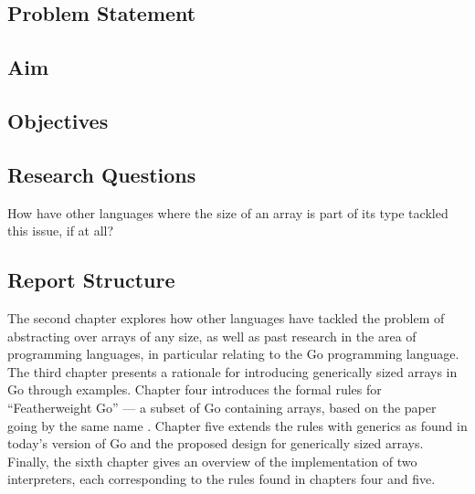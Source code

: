 

\subsection{Problem Statement}


\subsection{Aim}


\subsection{Objectives}


\subsection{Research Questions}

How have other languages where the size of an array is part of its type tackled
this issue, if at all?

\subsection{Report Structure}

The second chapter explores how other languages have tackled the problem of
abstracting over arrays of any size, as well as past research in the area of
programming languages, in particular relating to the Go programming language.
The third chapter presents a rationale for introducing generically sized arrays
in Go through examples. Chapter four introduces the formal rules for
``Featherweight Go'' --- a subset of Go containing arrays, based on the paper
going by the same name \autocite{fg}. Chapter five extends the rules with
generics as found in today's version of Go and the proposed design for
generically sized arrays. Finally, the sixth chapter gives an overview of the
implementation of two interpreters, each corresponding to the rules found in
chapters four and five.
